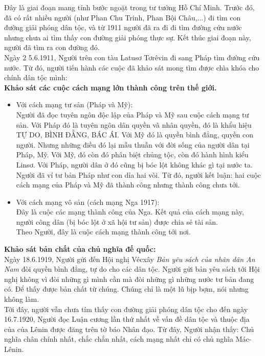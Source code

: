 \documentclass{article}
\begin{document}
\begin{enumerate}
		Đây là giai đoạn mang tính bước ngoặt trong tư tưởng Hồ Chí Minh. Trước đó, đã có rất nhiều người (như Phan Chu Trinh, Phan Bội Châu,...) đi tìm con đường giải phóng dân tộc, và từ 1911 người đã ra đi đi tìm đường cứu nước nhưng chưa ai tìm thấy con đường giải phóng thực sự. Kết thúc giai đoạn này, người đã tìm ra con đường đó.\\
		Ngày 2 5.6.1911, Người trên con tàu Latusơ Tơrêvin đi sang Pháp tìm đường cứu nước.
		Từ đó, người tiến hành các cuộc đã khảo sát mong tìm được chìa khóa cho chính dân tộc mình:\\
		\textbf{Khảo sát các cuộc cách mạng lớn thành công trên thế giới.}
		\begin{itemize}
			\item Với cách mạng tư sản (Pháp và Mỹ):\\
			Người đã đọc tuyên ngôn độc lập của Pháp và Mỹ sau cuộc cách mạng tư sản. Với Pháp đó là tuyên ngôn dân quyền và nhân quyền, đó là khẩu hiệu TỰ DO, BÌNH ĐẴNG, BÁC ÁI. Với Mỹ đó là quyền bình đẳng, quyền con người. Nhưng những điều đó lại mẫu thuẫn với đời sống của người dân tại Pháp, Mỹ. Với Mỹ, đó còn đó phân biệt chủng tộc, còn đó hành hình kiểu Linsơ. Với Pháp, người dân ở đó cũng bị bóc lột không khác gì tại nước ta. Người đã ví tư bản Pháp như con dỉa hai vòi. Từ đó, người kết luận: hai cuộc cách mạng của Pháp và Mỹ đã thành công nhưng thành công chưa tới.
			\item Với cách mạng vô sản (cách mạng Nga 1917):\\
			Đây là cuộc các mạng thành công của Nga. Kết quả của cách mạng này, người công dân (bị bóc lột ở xã hội tư sản) được chia sẻ tài sản.\\
			Theo Người, đây là cuộc cách mạng thành công tới nơi.
		\end{itemize}
		\textbf{Khảo sát bản chất của chủ nghĩa đế quốc: }\\
		Ngày 18.6.1919, Người gửi đến Hội nghị Vécxây \textit{Bản yêu sách của nhân dân An Nam} đòi quyền bình đẳng, tự do cho các dân tộc. Người gửi bản yêu sách tới Hội nghị không vì đòi những gì mình cần mà đòi những gì những nước tư bản đang có. Để thấy được bản chất từ chúng.
		Chúng chỉ là một lũ bịp bợm, nói nhưng không làm.\\
		Tới đây, người vẫn chưa tím thấy con đường giải phóng dân tộc cho đến ngày 16.7.1920, Người đọc Luận cương lần thứ nhất về vấn đề dân tộc và thuộc địa của của Lênin được đăng trên tờ báo Nhân đạo. Từ đây, Người nhận thấy: Chủ nghĩa chân chính nhất, chắc chắn nhất, cách mạng nhất chỉ có chủ nghĩa Mác-Lênin.\\

\end{enumerate}
\end{document}
